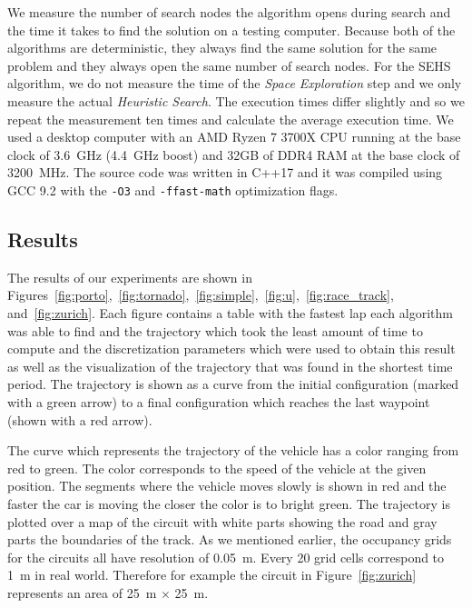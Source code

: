 We measure the number of search nodes the algorithm opens during search and the time it takes to find the solution on a testing computer. Because both of the algorithms are deterministic, they always find the same solution for the same problem and they always open the same number of search nodes. For the SEHS algorithm, we do not measure the time of the \textit{Space Exploration} step and we only measure the actual \textit{Heuristic Search}. The execution times differ slightly and so we repeat the measurement ten times and calculate the average execution time. We used a desktop computer with an AMD Ryzen 7 3700X CPU running at the base clock of \SI{3.6}{\giga\hertz} (\SI{4.4}{\giga\hertz} boost) and \num{32}GB of DDR4 RAM at the base clock of \SI{3200}{\mega\hertz}. The source code was written in C++17 and it was compiled using GCC 9.2 with the \texttt{-O3} and \texttt{-ffast-math} optimization flags.

\subsection{Results}

The results of our experiments are shown in Figures~\ref{fig:porto},~\ref{fig:tornado},~\ref{fig:simple},~\ref{fig:u},~\ref{fig:race_track}, and~\ref{fig:zurich}. Each figure contains a table with the fastest lap each algorithm was able to find and the trajectory which took the least amount of time to compute and the discretization parameters which were used to obtain this result as well as the visualization of the trajectory that was found in the shortest time period. The trajectory is shown as a curve from the initial configuration (marked with a green arrow) to a final configuration which reaches the last waypoint (shown with a red arrow).

The curve which represents the trajectory of the vehicle has a color ranging from red to green. The color corresponds to the speed of the vehicle at the given position. The segments where the vehicle moves slowly is shown in red and the faster the car is moving the closer the color is to bright green. The trajectory is plotted over a map of the circuit with white parts showing the road and gray parts the boundaries of the track. As we mentioned earlier, the occupancy grids for the circuits all have resolution of \SI{0.05}{\meter}. Every \num{20} grid cells correspond to \SI{1}{\meter} in real world. Therefore for example the circuit in Figure~\ref{fig:zurich} represents an area of \SI{25}{\meter} $\times$ \SI{25}{\meter}.

